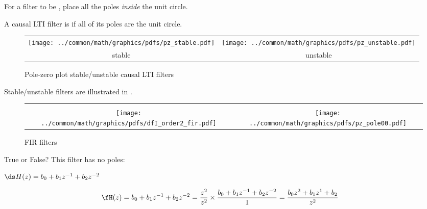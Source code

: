 For a filter to be , place all the poles \emph{inside} the unit circle.
\begin{theorem}
A causal LTI filter is  if all of its poles are  the unit circle.
\end{theorem}

\begin{figure}[ht]
  \centering%
  \begin{tabular}{|c|c|}
     \hline
     \texttt{[image: ../common/math/graphics/pdfs/pz\_stable.pdf]}
    &\texttt{[image: ../common/math/graphics/pdfs/pz\_unstable.pdf]}
    \\stable & unstable
    \\\hline
\end{tabular}
  \caption{
     Pole-zero plot stable/unstable causal LTI filters 
     \label{fig:pz_unstable}
     }
\end{figure}
\begin{example}
\label{ex:pz_unstable}
Stable/unstable filters are illustrated in .
\end{example}

\begin{figure}
  \centering
  \begin{tabular}{|c|c|}
      \hline
    \\\texttt{[image: ../common/math/graphics/pdfs/dfI\_order2\_fir.pdf]}
     &\texttt{[image: ../common/math/graphics/pdfs/pz\_pole00.pdf]}
    \\\hline
  \end{tabular}
  \caption{FIR filters \label{fig:fir}}
\end{figure}
True or False? This filter has no poles:

  $\ds H(z)= b_0 + b_1 z^{-1} + b_2 z^{-2}$


\begin{align*}
  \fH(z)
    &= b_0 + b_1 z^{-1} + b_2 z^{-2}
     = \frac{z^2}{z^2} \times \frac{b_0 + b_1 z^{-1} + b_2 z^{-2}}{1}
     = \frac{b_0 z^2 + b_1 z^{1} + b_2 }{z^2}
\end{align*}


